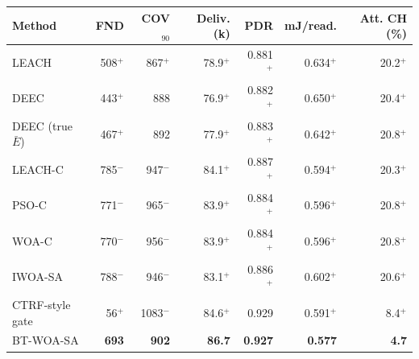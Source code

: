 \begin{tabular}{lrrrrrr}
\toprule
Method & FND & COV$_{90}$ & Deliv. (k) & PDR & mJ/read. & Att. CH (\%) \\
\midrule
LEACH & 508$^{+}$ & 867$^{+}$ & 78.9$^{+}$ & 0.881$^{+}$ & 0.634$^{+}$ & 20.2$^{+}$ \\
DEEC & 443$^{+}$ & 888 & 76.9$^{+}$ & 0.882$^{+}$ & 0.650$^{+}$ & 20.4$^{+}$ \\
DEEC (true $\bar{E}$) & 467$^{+}$ & 892 & 77.9$^{+}$ & 0.883$^{+}$ & 0.642$^{+}$ & 20.8$^{+}$ \\
LEACH-C & 785$^{-}$ & 947$^{-}$ & 84.1$^{+}$ & 0.887$^{+}$ & 0.594$^{+}$ & 20.3$^{+}$ \\
PSO-C & 771$^{-}$ & 965$^{-}$ & 83.9$^{+}$ & 0.884$^{+}$ & 0.596$^{+}$ & 20.8$^{+}$ \\
WOA-C & 770$^{-}$ & 956$^{-}$ & 83.9$^{+}$ & 0.884$^{+}$ & 0.596$^{+}$ & 20.8$^{+}$ \\
IWOA-SA & 788$^{-}$ & 946$^{-}$ & 83.1$^{+}$ & 0.886$^{+}$ & 0.602$^{+}$ & 20.6$^{+}$ \\
CTRF-style gate & 56$^{+}$ & 1083$^{-}$ & 84.6$^{+}$ & 0.929 & 0.591$^{+}$ & 8.4$^{+}$ \\
BT-WOA-SA & \textbf{693} & \textbf{902} & \textbf{86.7} & \textbf{0.927} & \textbf{0.577} & \textbf{4.7} \\
\bottomrule
\end{tabular}
